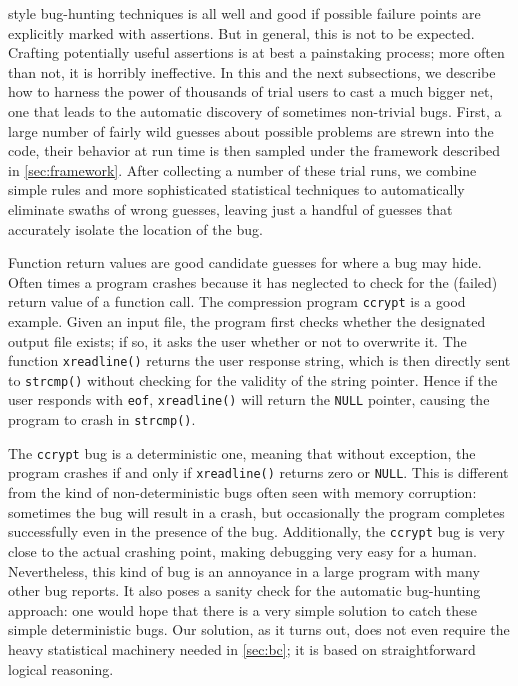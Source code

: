 \CCured style bug-hunting techniques is all well and good if possible
failure points are explicitly marked with assertions.  But in general,
this is not to be expected.  Crafting potentially useful assertions is
at best a painstaking process; more often than not, it is horribly
ineffective.  In this and the next subsections, we describe how to
harness the power of thousands of trial users to cast a much bigger
net, one that leads to the automatic discovery of sometimes
non-trivial bugs.  First, a large number of fairly wild guesses about
possible problems are strewn into the code, their behavior at run time
is then sampled under the framework described in
\autoref{sec:framework}.  After collecting a number of these trial
runs, we combine simple rules and more sophisticated statistical
techniques to automatically eliminate swaths of wrong guesses, leaving
just a handful of guesses that accurately isolate the location of the
bug.

Function return values are good candidate guesses for where a bug may
hide.  Often times a program crashes because it has neglected to check
for the (failed) return value of a function call.  The compression
program \texttt{ccrypt} is a good example.  Given an input file, the
program first checks whether the designated output file exists; if
so, it asks the user whether or not to overwrite it.  The function
\texttt{xreadline()} returns the user response string, which is then
directly sent to \texttt{strcmp()} without checking for the validity
of the string pointer.  Hence if the user responds with \texttt{eof},
\texttt{xreadline()} will return the \texttt{NULL} pointer, causing the
program to crash in \texttt{strcmp()}.

The \texttt{ccrypt} bug is a deterministic one, meaning that without
exception, the program crashes if and only if \texttt{xreadline()}
returns zero or \texttt{NULL}.  This is different from the kind of
non-deterministic bugs often seen with memory corruption: sometimes
the bug will result in a crash, but occasionally the program completes
successfully even in the presence of the bug.  Additionally, the
\texttt{ccrypt} bug is very close to the actual crashing point, making
debugging very easy for a human.  Nevertheless, this kind of bug is an
annoyance in a large program with many other bug reports.  It also
poses a sanity check for the automatic bug-hunting approach: one
would hope that there is a very simple solution to catch these
simple deterministic bugs.  Our solution, as it turns out, does not
even require the heavy statistical machinery needed in
\autoref{sec:bc}; it is based on straightforward logical
reasoning.

